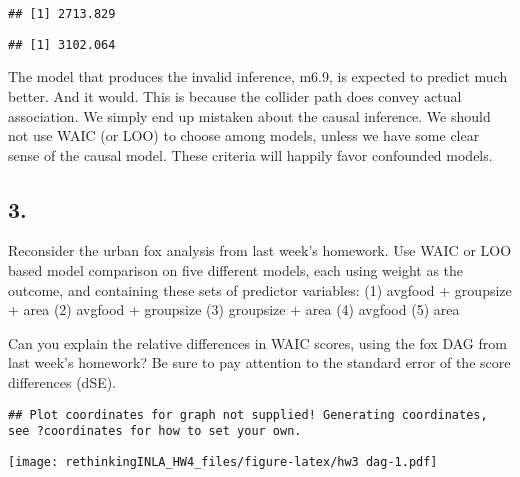 \documentclass[
]{article}
\newenvironment{Shaded}{\begin{snugshade}}{\end{snugshade}}
\newcommand{\FloatTok}[1]{\textcolor[rgb]{0.00,0.00,0.81}{#1}}
\newcommand{\KeywordTok}[1]{\textcolor[rgb]{0.13,0.29,0.53}{\textbf{#1}}}
\newcommand{\NormalTok}[1]{#1}
\newcommand{\OperatorTok}[1]{\textcolor[rgb]{0.81,0.36,0.00}{\textbf{#1}}}
\newcommand{\StringTok}[1]{\textcolor[rgb]{0.31,0.60,0.02}{#1}}
\begin{document}
\begin{verbatim}
## [1] 2713.829
\end{verbatim}

\begin{Shaded}
\end{Shaded}

\begin{verbatim}
## [1] 3102.064
\end{verbatim}

The model that produces the invalid inference, m6.9, is expected to
predict much better. And it would. This is because the collider path
does convey actual association. We simply end up mistaken about the
causal inference. We should not use WAIC (or LOO) to choose among
models, unless we have some clear sense of the causal model. These
criteria will happily favor confounded models.

\hypertarget{section-2}{%
\subsection{3.}\label{section-2}}

Reconsider the urban fox analysis from last week's homework. Use WAIC or
LOO based model comparison on five different models, each using weight
as the outcome, and containing these sets of predictor variables: (1)
avgfood + groupsize + area (2) avgfood + groupsize (3) groupsize + area
(4) avgfood (5) area

Can you explain the relative differences in WAIC scores, using the fox
DAG from last week's homework? Be sure to pay attention to the standard
error of the score differences (dSE).

\begin{verbatim}
## Plot coordinates for graph not supplied! Generating coordinates, see ?coordinates for how to set your own.
\end{verbatim}

\texttt{[image: rethinkingINLA\_HW4\_files/figure-latex/hw3 dag-1.pdf]}

\begin{Shaded}
\end{Shaded}
\end{document}
